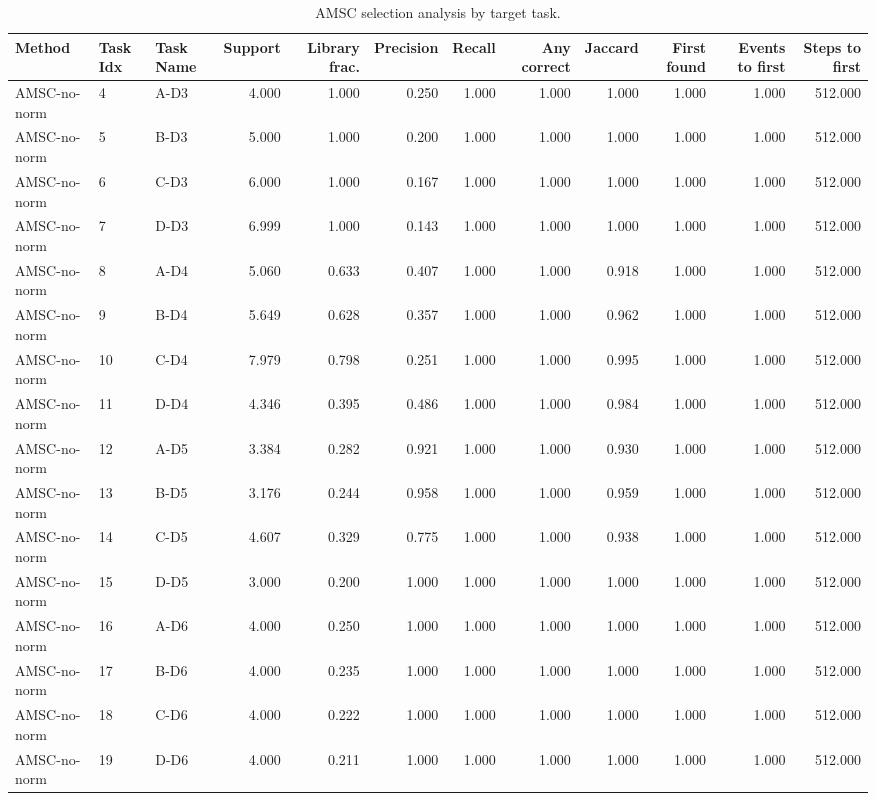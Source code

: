 \begin{table}[ht]
    \caption{AMSC selection analysis by target task.}
    \label{tbl:amsc_selection_task}
    \centering
    \scriptsize
    \begin{tabular}{lllrrrrrrrrr}
    \toprule
Method & Task Idx & Task Name & Support & Library frac. & Precision & Recall & Any correct & Jaccard & First found & Events to first & Steps to first \\
    \midrule
AMSC-no-norm & 4 & A-D3 & 4.000 & 1.000 & 0.250 & 1.000 & 1.000 & 1.000 & 1.000 & 1.000 & 512.000 \\
AMSC-no-norm & 5 & B-D3 & 5.000 & 1.000 & 0.200 & 1.000 & 1.000 & 1.000 & 1.000 & 1.000 & 512.000 \\
AMSC-no-norm & 6 & C-D3 & 6.000 & 1.000 & 0.167 & 1.000 & 1.000 & 1.000 & 1.000 & 1.000 & 512.000 \\
AMSC-no-norm & 7 & D-D3 & 6.999 & 1.000 & 0.143 & 1.000 & 1.000 & 1.000 & 1.000 & 1.000 & 512.000 \\
AMSC-no-norm & 8 & A-D4 & 5.060 & 0.633 & 0.407 & 1.000 & 1.000 & 0.918 & 1.000 & 1.000 & 512.000 \\
AMSC-no-norm & 9 & B-D4 & 5.649 & 0.628 & 0.357 & 1.000 & 1.000 & 0.962 & 1.000 & 1.000 & 512.000 \\
AMSC-no-norm & 10 & C-D4 & 7.979 & 0.798 & 0.251 & 1.000 & 1.000 & 0.995 & 1.000 & 1.000 & 512.000 \\
AMSC-no-norm & 11 & D-D4 & 4.346 & 0.395 & 0.486 & 1.000 & 1.000 & 0.984 & 1.000 & 1.000 & 512.000 \\
AMSC-no-norm & 12 & A-D5 & 3.384 & 0.282 & 0.921 & 1.000 & 1.000 & 0.930 & 1.000 & 1.000 & 512.000 \\
AMSC-no-norm & 13 & B-D5 & 3.176 & 0.244 & 0.958 & 1.000 & 1.000 & 0.959 & 1.000 & 1.000 & 512.000 \\
AMSC-no-norm & 14 & C-D5 & 4.607 & 0.329 & 0.775 & 1.000 & 1.000 & 0.938 & 1.000 & 1.000 & 512.000 \\
AMSC-no-norm & 15 & D-D5 & 3.000 & 0.200 & 1.000 & 1.000 & 1.000 & 1.000 & 1.000 & 1.000 & 512.000 \\
AMSC-no-norm & 16 & A-D6 & 4.000 & 0.250 & 1.000 & 1.000 & 1.000 & 1.000 & 1.000 & 1.000 & 512.000 \\
AMSC-no-norm & 17 & B-D6 & 4.000 & 0.235 & 1.000 & 1.000 & 1.000 & 1.000 & 1.000 & 1.000 & 512.000 \\
AMSC-no-norm & 18 & C-D6 & 4.000 & 0.222 & 1.000 & 1.000 & 1.000 & 1.000 & 1.000 & 1.000 & 512.000 \\
AMSC-no-norm & 19 & D-D6 & 4.000 & 0.211 & 1.000 & 1.000 & 1.000 & 1.000 & 1.000 & 1.000 & 512.000 \\

\end{tabular}
\end{table}
